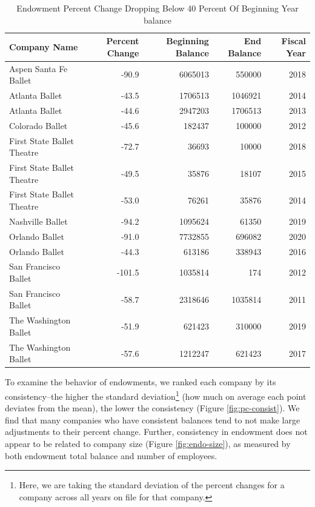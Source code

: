 \documentclass[Dance Data
Project,article,submit,moreauthors,pdftex]{mdpi}
\begin{document}
\begin{table}[!h]

\caption{Endowment Percent Change Dropping Below 40 Percent Of Beginning Year balance}
\centering
\begin{tabular}[t]{lrrrr}
\toprule
Company Name & Percent Change & Beginning Balance & End Balance & Fiscal Year\\
\midrule
Aspen Santa Fe Ballet & -90.9 & 6065013 & 550000 & 2018\\
\addlinespace
Atlanta Ballet & -43.5 & 1706513 & 1046921 & 2014\\
\addlinespace
Atlanta Ballet & -44.6 & 2947203 & 1706513 & 2013\\
\addlinespace
Colorado Ballet & -45.6 & 182437 & 100000 & 2012\\
\addlinespace
First State Ballet Theatre & -72.7 & 36693 & 10000 & 2018\\
\addlinespace
First State Ballet Theatre & -49.5 & 35876 & 18107 & 2015\\
\addlinespace
First State Ballet Theatre & -53.0 & 76261 & 35876 & 2014\\
\addlinespace
Nashville Ballet & -94.2 & 1095624 & 61350 & 2019\\
\addlinespace
Orlando Ballet & -91.0 & 7732855 & 696082 & 2020\\
\addlinespace
Orlando Ballet & -44.3 & 613186 & 338943 & 2016\\
\addlinespace
San Francisco Ballet & -101.5 & 1035814 & 174 & 2012\\
\addlinespace
San Francisco Ballet & -58.7 & 2318646 & 1035814 & 2011\\
\addlinespace
The Washington Ballet & -51.9 & 621423 & 310000 & 2019\\
\addlinespace
The Washington Ballet & -57.6 & 1212247 & 621423 & 2017\\
\bottomrule
\end{tabular}
\end{table}

To examine the behavior of endowments, we ranked each company by its
consistency--the higher the standard deviation\footnote{Here, we are
  taking the standard deviation of the percent changes for a company
  across all years on file for that company.} (how much on average each
point deviates from the mean), the lower the consistency (Figure
\ref{fig:pc-consist}). We find that many companies who have consistent
balances tend to not make large adjustments to their percent change.
Further, consistency in endowment does not appear to be related to
company size (Figure \ref{fig:endo-size}), as measured by both endowment
total balance and number of employees.
\end{document}
